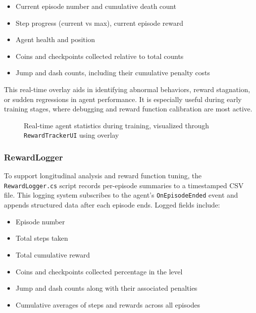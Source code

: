 \documentclass[12pt,oneside,openright,a4paper]{cpe-english-project}
\begin{document}
\begin{itemize}
\item Current episode number and cumulative death count
\item Step progress (current vs max), current episode reward
\item Agent health and position
\item Coins and checkpoints collected relative to total counts
\item Jump and dash counts, including their cumulative penalty costs
\end{itemize}

This real-time overlay aids in identifying abnormal behaviors, reward stagnation, or sudden regressions in agent performance. It is especially useful during early training stages, where debugging and reward function calibration are most active.

\begin{figure}[H]
\centering
{}
\caption{Real-time agent statistics during training, visualized through \texttt{RewardTrackerUI} using overlay}
\label{fig:RewardTrackerUIExample}
\end{figure}

\subsubsection{RewardLogger}

To support longitudinal analysis and reward function tuning, the \texttt{RewardLogger.cs} script records per-episode summaries to a timestamped CSV file. This logging system subscribes to the agent’s \texttt{OnEpisodeEnded} event and appends structured data after each episode ends. Logged fields include:

\begin{itemize}
\item Episode number
\item Total steps taken
\item Total cumulative reward
\item Coins and checkpoints collected percentage in the level
\item Jump and dash counts along with their associated penalties
\item Cumulative averages of steps and rewards across all episodes
\end{itemize}
\end{document}
